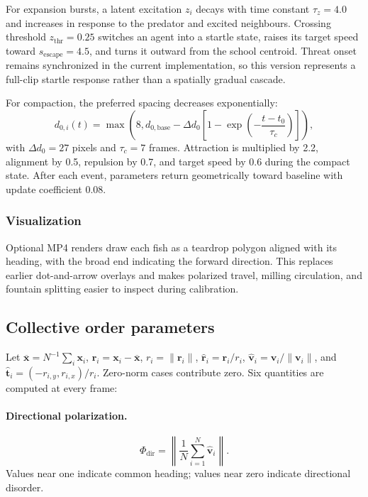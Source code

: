 \documentclass[11pt]{article}
\newcommand{\phidir}{\Phi_{\mathrm{dir}}}
\begin{document}
For expansion bursts, a latent excitation \(z_i\) decays with time constant \(\tau_z=4.0\) and increases in
response to the predator and excited neighbours. Crossing threshold \(z_{\mathrm{thr}}=0.25\) switches an
agent into a startle state, raises its target speed toward \(s_{\mathrm{escape}}=4.5\), and turns it
outward from the school centroid. Threat onset remains synchronized in the current implementation, so
this version represents a full-clip startle response rather than a spatially gradual cascade.

For compaction, the preferred spacing decreases exponentially:
\begin{equation}
 d_{0,i}(t)=\max\!\left(8,d_{0,\mathrm{base}}-\Delta d_0
 \left[1-\exp\!\left(-\frac{t-t_0}{\tau_c}\right)\right]\right),
\end{equation}
with \(\Delta d_0=27\) pixels and \(\tau_c=7\) frames. Attraction is multiplied by 2.2, alignment by 0.5,
repulsion by 0.7, and target speed by 0.6 during the compact state. After each event, parameters return
geometrically toward baseline with update coefficient 0.08.

\subsubsection{Visualization}

Optional MP4 renders draw each fish as a teardrop polygon aligned with its heading, with the broad
end indicating the forward direction. This replaces earlier dot-and-arrow overlays and makes polarized
travel, milling circulation, and fountain splitting easier to inspect during calibration.

\subsection{Collective order parameters}

Let \(\overline{\bm{x}}=N^{-1}\sum_i\bm{x}_i\),
\(\bm{r}_i=\bm{x}_i-\overline{\bm{x}}\), \(r_i=\|\bm{r}_i\|\),
\(\widehat{\bm{r}}_i=\bm{r}_i/r_i\),
\(\widehat{\bm{v}}_i=\bm{v}_i/\|\bm{v}_i\|\), and
\(\widehat{\bm{t}}_i=(-r_{i,y},r_{i,x})/r_i\). Zero-norm cases contribute zero.
Six quantities are computed at every frame:

\paragraph{Directional polarization.}
\begin{equation}
 \phidir=\left\|\frac{1}{N}\sum_{i=1}^{N}\widehat{\bm{v}}_i\right\|.
\end{equation}
Values near one indicate common heading; values near zero indicate directional disorder.
\end{document}
